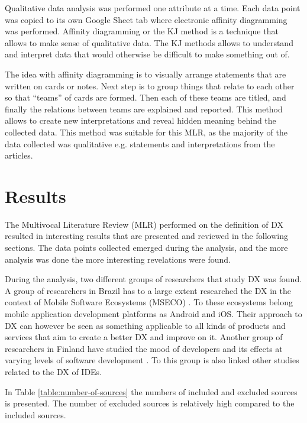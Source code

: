 \documentclass[english, 12pt, a4paper, sci, utf8, a-1b, online]{aaltothesis}
\begin{document}
Qualitative data analysis was performed one attribute at a time. Each data point was copied to its own Google Sheet tab where electronic affinity diagramming was performed. Affinity diagramming or the KJ method \parencite{scupin1997kj} is a technique that allows to make sense of qualitative data. The KJ methods allows to understand and interpret data that would otherwise be difficult to make something out of.

The idea with affinity diagramming is to visually arrange statements that are written on cards or notes. Next step is to group things that relate to each other so that ``teams'' of cards are formed. Then each of these teams are titled, and finally the relations between teams are explained and reported. This method allows to create new interpretations and reveal hidden meaning behind the collected data. This method was suitable for this MLR, as the majority of the data collected was qualitative e.g. statements and interpretations from the articles.

\clearpage
\section{Results} \label{section:results}

The Multivocal Literature Review (MLR) performed on the definition of DX resulted in interesting results that are presented and reviewed in the following sections. The data points collected emerged during the analysis, and the more analysis was done the more interesting revelations were found.

During the analysis, two different groups of researchers that study DX was found. A group of researchers in Brazil has to a large extent researched the DX in the context of Mobile Software Ecosystems (MSECO) \parencite{fontao2015research, fontao2016mseco, fontao2018mobile, fontao2017investigating, fontao2017facing}. To these ecosystems belong mobile application development platforms as Android and iOS. Their approach to DX can however be seen as something applicable to all kinds of products and services that aim to create a better DX and improve on it. Another group of researchers in Finland have studied the mood of developers and its effects at varying levels of software development \parencite{what-happens-when-unhappy, unhappy-developers,on-the-unhappiness, consequences-of-unhappiness}. To this group is also linked other studies related to the DX of IDEs.

In Table \ref{table:number-of-sources} the numbers of included and excluded sources is presented. The number of excluded sources is relatively high compared to the included sources.
\end{document}
